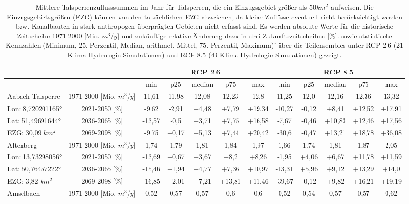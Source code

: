 \renewcommand{\arraystretch}{1.2}
\addtolength{\tabcolsep}{-5.9pt}
\scriptsize
\begin{longtable}{@{\extracolsep{\fill}}lc|ccccc||ccccc}
\caption{Mittlere Talsperrenzuflusssummen im Jahr für Talsperren, die ein Einzugsgebiet größer als $50 km^2$ aufweisen. Die Einzugsgebietsgrößen (EZG) können von den tatsächlichen EZG abweichen, da kleine Zuflüsse eventuell nicht berücksichtigt werden bzw. Kanalbauten in stark anthropogen überprägten Gebieten nicht erfasst sind. Es werden absolute Werte für die historische Zeitscheibe 1971-2000 [Mio. $m^3/y$] und zukünftige relative Änderung dazu in drei Zukunftszeitscheiben [\%]. sowie statistische Kennzahlen (Minimum, 25. Perzentil, Median, arithmet. Mittel, 75. Perzentil, Maximum)' über die Teilensembles unter RCP 2.6 (21 Klima-Hydrologie-Simulationen) und RCP 8.5 (49 Klima-Hydrologie-Simulationen) gezeigt.}\\  \hline
\multicolumn{2}{c}{} & \multicolumn{5}{c||}{RCP 2.6}  & \multicolumn{5}{c}{RCP 8.5}\\ \hline
\multicolumn{2}{c|}{} & min & p25 & median & p75 & max & min & p25 & median & p75 & max\\ 
\hline 
Aabach-Talsperre & 1971-2000 [Mio. $m^3/y$]  & 11,61 & 11,98 & 12,08 & 12,23 & 12,8 & 11,25 & 12,0 & 12,16 & 12,36 & 13,32\\ 
\cline{2-12} 
Lon: 8,720201165° & 2021-2050 [\%]  & -9,62 & -2,91 & +4,48 & +7,79 & +19,34 & -10,27 & -0,12 & +8,41 & +12,52 & +17,91\\ 
Lat: 51,49691644° & 2036-2065 [\%]  & -13,57 & -0,5 & +3,71 & +7,75 & +16,58 & -7,67 & -0,46 & +10,83 & +12,46 & +17,56\\ 
EZG: 30,09 $km^2$ & 2069-2098 [\%]  & -9,75 & +0,17 & +5,13 & +7,44 & +20,42 & -30,6 & -0,47 & +13,21 & +18,78 & +36,08\\ 
\hline 
Altenberg & 1971-2000 [Mio. $m^3/y$]  & 1,74 & 1,79 & 1,81 & 1,84 & 1,97 & 1,66 & 1,74 & 1,81 & 1,87 & 2,05\\ 
\cline{2-12} 
Lon: 13,73298056° & 2021-2050 [\%]  & -13,69 & +0,67 & +3,67 & +8,2 & +8,26 & -1,95 & +4,06 & +6,67 & +11,78 & +11,59\\ 
Lat: 50,76457222° & 2036-2065 [\%]  & -15,46 & +1,94 & +4,77 & +7,36 & +10,97 & -13,31 & +5,96 & +9,12 & +13,29 & +14,0\\ 
EZG: 3,82 $km^2$ & 2069-2098 [\%]  & -16,85 & +2,01 & +7,21 & +13,81 & +11,46 & -39,67 & -0,12 & +9,82 & +16,21 & +19,19\\ 
\hline 
Amselbach & 1971-2000 [Mio. $m^3/y$]  & 0,52 & 0,57 & 0,57 & 0,6 & 0,6 & 0,52 & 0,54 & 0,57 & 0,57 & 0,62\\ 

\end{longtable}
